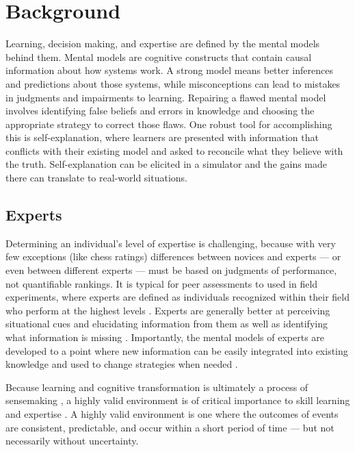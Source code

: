 
\chapter{Background}

Learning, decision making, and expertise are defined by the mental models behind them. Mental models are cognitive constructs that contain causal information about how systems work. A strong model means better inferences and predictions about those systems, while misconceptions can lead to mistakes in judgments and impairments to learning. Repairing a flawed mental model involves identifying false beliefs and errors in knowledge and choosing the appropriate strategy to correct those flaws. One robust tool for accomplishing this is self-explanation, where learners are presented with information that conflicts with their existing model and asked to reconcile what they believe with the truth. Self-explanation can be elicited in a simulator and the gains made there can translate to real-world situations.

\section{Experts}

Determining an individual's level of expertise is challenging, because with very few exceptions (like chess ratings) differences between novices and experts --- or even between different experts --- must be based on judgments of performance, not quantifiable rankings. It is typical for peer assessments to used in field experiments, where experts are defined as individuals recognized within their field who perform at the highest levels \citep{Kahneman2009}. Experts are generally better at perceiving situational cues and elucidating information from them \citep{Nee2006, Klein1999} as well as identifying what information is missing \citep{Klein1992}. Importantly, the mental models of experts are developed to a point where new information can be easily integrated into existing knowledge and used to change strategies when needed \citep{Glaser1996}.

Because learning and cognitive transformation is ultimately a process of sensemaking \citep{Klein2006}, a highly valid environment is of critical importance to skill learning and expertise \citep{Kahneman2009}. A highly valid environment is one where the outcomes of events are consistent, predictable, and occur within a short period of time --- but not necessarily without uncertainty.

